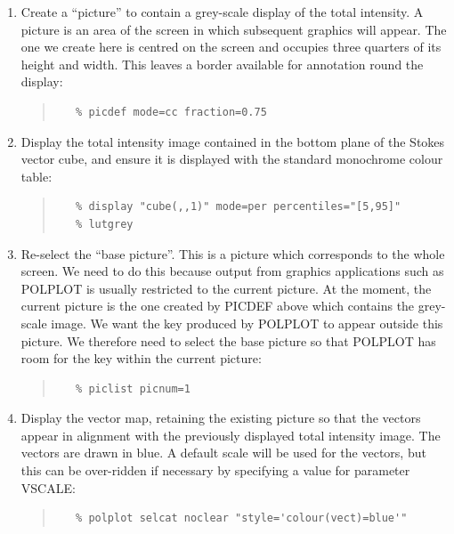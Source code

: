 \documentclass[twoside,11pt]{article}
\newcommand{\htmlref}[2]{#1}
\renewcommand{\_}{\texttt{\symbol{95}}}
\newenvironment{myquote}{\begin{quote}\begin{small}}{\end{small}\end{quote}}
\begin{document}
\begin{enumerate}
\item \label{STEP:PICDEF} Create a ``picture'' to contain a grey-scale display of the total
intensity. A picture is an area of the screen in which subsequent graphics
will appear. The one we create here is centred on the screen and occupies
three quarters of its height and width. This leaves a border available
for annotation round the display:
\begin{myquote}
\begin{verbatim}
   % picdef mode=cc fraction=0.75
\end{verbatim}
\end{myquote}

\item \label{STEP:DISPLAY} Display the total intensity image contained in the bottom plane of 
the Stokes vector cube, and ensure it is displayed with the standard 
monochrome colour table:
\begin{myquote}
\begin{verbatim}
   % display "cube(,,1)" mode=per percentiles="[5,95]"
   % lutgrey
\end{verbatim}
\end{myquote}

\item \label{STEP:PICLIST} Re-select the ``base picture''. This is a
picture which corresponds to the whole screen. We need to do this because
output from graphics applications such as POLPLOT is usually restricted
to the current picture. At the moment, the current picture is the one
created by PICDEF above which contains the grey-scale image. We want the
key produced by POLPLOT to appear outside this picture. We therefore need
to select the base picture so that POLPLOT has room for the key within
the current picture:
\begin{myquote}
\begin{verbatim}
   % piclist picnum=1
\end{verbatim}
\end{myquote}

\item \label{STEP:POLPLOT} Display the vector map, retaining the existing picture so that the
vectors appear in alignment with the previously displayed total intensity
image. The vectors are drawn in blue. A default scale will be used for the 
vectors, but this can be over-ridden if necessary by specifying a value for
parameter \htmlref{VSCALE}{POLPLOT}:
\begin{myquote}
\begin{verbatim}
   % polplot selcat noclear "style='colour(vect)=blue'"
\end{verbatim}
\end{myquote}

\end{enumerate}
\end{document}

